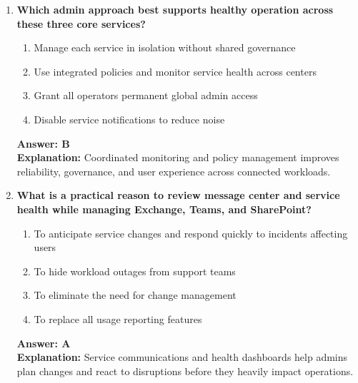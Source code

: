 \documentclass[10pt]{article}
\begin{document}
\begin{enumerate}[leftmargin=*]
\item \textbf{Which admin approach best supports healthy operation across these three core services?}
\begin{enumerate}[label=\Alph*.]
  \item Manage each service in isolation without shared governance
  \item Use integrated policies and monitor service health across centers
  \item Grant all operators permanent global admin access
  \item Disable service notifications to reduce noise
\end{enumerate}
\textbf{Answer: B}\\
\textbf{Explanation:} Coordinated monitoring and policy management improves reliability, governance, and user experience across connected workloads.

\item \textbf{What is a practical reason to review message center and service health while managing Exchange, Teams, and SharePoint?}
\begin{enumerate}[label=\Alph*.]
  \item To anticipate service changes and respond quickly to incidents affecting users
  \item To hide workload outages from support teams
  \item To eliminate the need for change management
  \item To replace all usage reporting features
\end{enumerate}
\textbf{Answer: A}\\
\textbf{Explanation:} Service communications and health dashboards help admins plan changes and react to disruptions before they heavily impact operations.

\end{enumerate}
\clearpage
\end{document}
